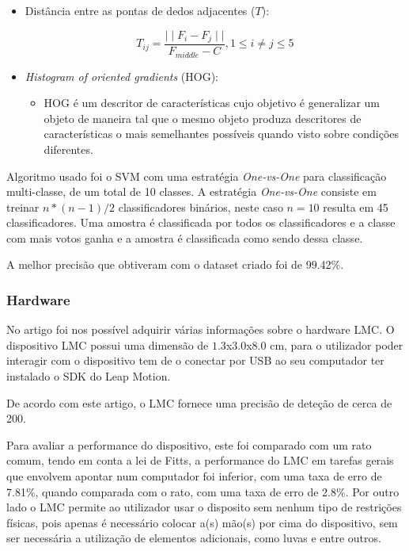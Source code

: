 \documentclass{TTUPhD}
\begin{document}
\begin{itemize}
    \item Distância entre as pontas de dedos adjacentes ($T$):

    \begin{equation}
        T_{ij} = \frac{\mid\mid F_i - F_j \mid\mid}{F_{middle} - C}, 1 \le i \ne j \le 5
    \end{equation}

    \item \textit{Histogram of oriented gradients} (HOG):
    \begin{itemize}
        \item HOG é um descritor de características cujo objetivo é generalizar um objeto de maneira tal que o mesmo objeto
              produza descritores de características o mais semelhantes possíveis quando visto sobre condições diferentes.
    \end{itemize}
\end{itemize}

Algoritmo usado foi o SVM com uma estratégia \textit{One-vs-One} para classificação multi-classe, de um total de 10 classes.
A estratégia \textit{One-vs-One} consiste em treinar $n * (n-1) / 2$ classificadores binários, neste caso $n = 10$ resulta em 45 classificadores.
Uma amostra é classificada por todos os classificadores e a classe com mais votos ganha e a amostra é classificada como sendo dessa classe.

A melhor precisão que obtiveram com o dataset criado foi de 99.42\%.

\subsubsection{Hardware}

No artigo \cite{linshao} foi nos possível adquirir várias informações sobre o hardware LMC.
O dispositivo LMC possui uma dimensão de $1.3$x$3.0$x$8.0$ cm, para o utilizador poder interagir com o dispositivo
tem de o conectar por USB ao seu computador ter instalado o SDK do Leap Motion.

De acordo com este artigo, o LMC fornece uma precisão de deteção de cerca de 200.

Para avaliar a performance do dispositivo, este foi comparado com um rato comum, tendo em conta a lei de Fitts, a performance
do LMC em tarefas gerais que envolvem apontar num computador foi inferior, com uma taxa de erro de 7.81\%, quando comparada com o rato,
com uma taxa de erro de 2.8\%.
Por outro lado o LMC permite ao utilizador usar o disposito sem nenhum tipo de restrições físicas, pois apenas é necessário colocar a(s)
mão(s) por cima do dispositivo, sem ser necessária a utilização de elementos adicionais, como luvas e entre outros.
\end{document}
